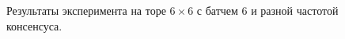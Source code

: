 \documentclass[a4paper,article,14pt]{extarticle}
\begin{document}
\begin{figure}[H]
\begin{center}
\caption{ \label{fig:torus6x6_b6_different_freqs}
     Результаты эксперимента на торе $6\times 6$ с батчем 6 и разной частотой консенсуса.}
\end{center}
\end{figure}
\end{document}
